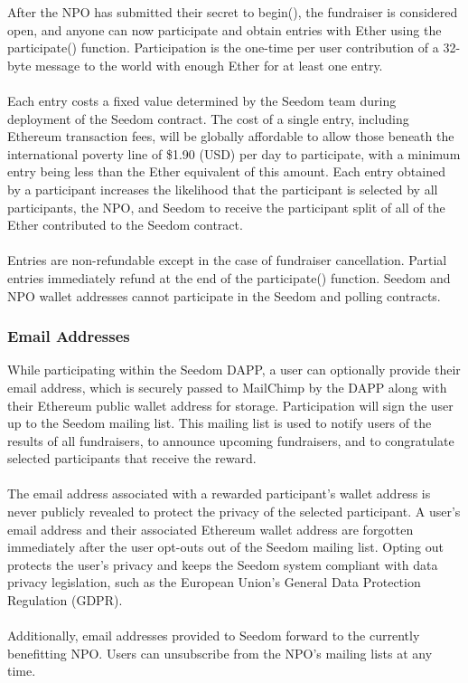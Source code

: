 \documentclass[11pt]{article}
\begin{document}
After the NPO has submitted their secret to begin(), the fundraiser is considered open, and anyone can now participate and obtain entries with Ether using the participate() function. Participation is the one-time per user contribution of a 32-byte message to the world with enough Ether for at least one entry.\\\\
Each entry costs a fixed value determined by the Seedom team during deployment of the Seedom contract. The cost of a single entry, including Ethereum transaction fees, will be globally affordable to allow those beneath the international poverty line of \$1.90 (USD) per day \cite{1} to participate, with a minimum entry being less than the Ether equivalent of this amount. Each entry obtained by a participant increases the likelihood that the participant is selected by all participants, the NPO, and Seedom to receive the participant split of all of the Ether contributed to the Seedom contract.\\\\
Entries are non-refundable except in the case of fundraiser cancellation. Partial entries immediately refund at the end of the participate() function. Seedom and NPO wallet addresses cannot participate in the Seedom and polling contracts.

\subsubsection{Email Addresses}

While participating within the Seedom DAPP, a user can optionally provide their email address, which is securely passed to MailChimp by the DAPP along with their Ethereum public wallet address for storage. Participation will sign the user up to the Seedom mailing list. This mailing list is used to notify users of the results of all fundraisers, to announce upcoming fundraisers, and to congratulate selected participants that receive the reward.\\\\
The email address associated with a rewarded participant's wallet address is never publicly revealed to protect the privacy of the selected participant. A user's email address and their associated Ethereum wallet address are forgotten immediately after the user opt-outs out of the Seedom mailing list. Opting out protects the user's privacy and keeps the Seedom system compliant with data privacy legislation, such as the European Union's General Data Protection Regulation (GDPR).\\\\
Additionally, email addresses provided to Seedom forward to the currently benefitting NPO. Users can unsubscribe from the NPO's mailing lists at any time.
\end{document}
